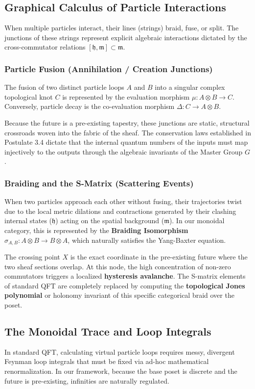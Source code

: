 \documentclass[12pt,letterpaper]{article}
\begin{document}
\subsection{Graphical Calculus of Particle Interactions}
When multiple particles interact, their lines (strings) braid, fuse, or split. The junctions of these strings represent explicit algebraic interactions dictated by the cross-commutator relations $[\mathfrak{h}, \mathfrak{m}] \subset \mathfrak{m}$.

\subsubsection{Particle Fusion (Annihilation / Creation Junctions)}
The fusion of two distinct particle loops $A$ and $B$ into a singular complex topological knot $C$ is represented by the evaluation morphism $\mu: A \otimes B \to C$. Conversely, particle decay is the co-evaluation morphism $\Delta: C \to A \otimes B$.

Because the future is a pre-existing tapestry, these junctions are static, structural crossroads woven into the fabric of the sheaf. The conservation laws established in Postulate 3.4 dictate that the internal quantum numbers of the inputs must map injectively to the outputs through the algebraic invariants of the Master Group $G$.

\subsubsection{Braiding and the S-Matrix (Scattering Events)}
When two particles approach each other without fusing, their trajectories twist due to the local metric dilations and contractions generated by their clashing internal states ($\mathfrak{h}$) acting on the spatial background ($\mathfrak{m}$). In our monoidal category, this is represented by the \textbf{Braiding Isomorphism} $\sigma_{A,B}: A \otimes B \to B \otimes A$, which naturally satisfies the Yang-Baxter equation.

The crossing point $X$ is the exact coordinate in the pre-existing future where the two sheaf sections overlap. At this node, the high concentration of non-zero commutators triggers a localized \textbf{hysteresis avalanche}. The S-matrix elements of standard QFT are completely replaced by computing the \textbf{topological Jones polynomial} or holonomy invariant of this specific categorical braid over the poset.

\subsection{The Monoidal Trace and Loop Integrals}
In standard QFT, calculating virtual particle loops requires messy, divergent Feynman loop integrals that must be fixed via ad-hoc mathematical renormalization. In our framework, because the base poset is discrete and the future is pre-existing, infinities are naturally regulated.
\end{document}
